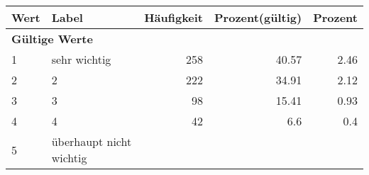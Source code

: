      \begin{longtable}{lXrrr}
     \toprule
     \textbf{Wert} & \textbf{Label} & \textbf{Häufigkeit} & \textbf{Prozent(gültig)} & \textbf{Prozent} \\
     \endhead
     \midrule
     \multicolumn{5}{l}{\textbf{Gültige Werte}}\\

     1 &
     \multicolumn{1}{X}{ sehr wichtig   } &


       \num{258} &
       \num[round-mode=places,round-precision=2]{40,57} &
         \num[round-mode=places,round-precision=2]{2,46} \\

     2 &
     \multicolumn{1}{X}{ 2   } &


       \num{222} &
       \num[round-mode=places,round-precision=2]{34,91} &
         \num[round-mode=places,round-precision=2]{2,12} \\

     3 &
     \multicolumn{1}{X}{ 3   } &


       \num{98} &
       \num[round-mode=places,round-precision=2]{15,41} &
         \num[round-mode=places,round-precision=2]{0,93} \\

     4 &
     \multicolumn{1}{X}{ 4   } &


       \num{42} &
       \num[round-mode=places,round-precision=2]{6,6} &
         \num[round-mode=places,round-precision=2]{0,4} \\

     5 &
     \multicolumn{1}{X}{ überhaupt nicht wichtig   } &



\end{longtable}
